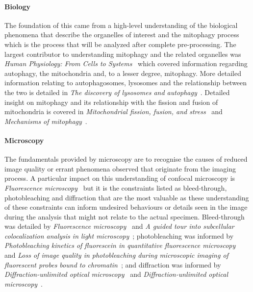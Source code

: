 \paragraph{Biology} The foundation of this came from a high-level understanding of the biological phenomena that describe the organelles of interest and the mitophagy process which is the process that will be analyzed after complete pre-processing. The largest contributor to understanding mitophagy and the related organelles was \textit{Human Physiology: From Cells to Systems}~\cite{cell_phys_book} which covered information regarding autophagy, the mitochondria and, to a lesser degree, mitophagy. More detailed information relating to autophagosomes, lysosomes and the relationship between the two is detailed in \textit{The discovery of lysosomes and autophagy}~\cite{lyso_auto_relation}. Detailed insight on mitophagy and its relationship with the fission and fusion of mitochondria is covered in \textit{Mitochondrial fission, fusion, and stress}~\cite{MitoFus-2012} and \textit{Mechanisms of mitophagy}~\cite{MitoMechan}. \paragraph{Microscopy} The fundamentals provided by microscopy are to recognise the causes of reduced image quality or errant phenomena observed that originate from the imaging process. A particular impact on this understanding of confocal microscopy is \textit{Fluorescence microscopy}~\cite{Sanderson-2014} but it is the constraints listed as bleed-through, photobleaching and diffraction that are the most valuable as these understanding of these constraints can inform undesired behaviours or details seen in the image during the analysis that might not relate to the actual specimen. Bleed-through was detailed by \textit{Fluorescence microscopy}~\cite{Sanderson-2014} and \textit{A guided tour into subcellular colocalization analysis in light
microscopy}~\cite{Bolte-2006}; photobleaching was informed by \textit{Photobleaching kinetics of fluorescein in
quantitative fluorescence microscopy}~\cite{photobleach_excite} and \textit{Loss of image quality in photobleaching
during microscopic imaging of fluorescent probes bound to chromatin}~\cite{photobleachingPaper}; and diffraction was informed by \textit{Diffraction-unlimited optical microscopy}~\cite{Diffraction_Patterson} and \textit{ Diffraction-unlimited optical microscopy}~\cite{Diffraction_Dedecker}.

